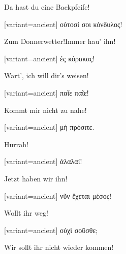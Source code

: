 Da hast du eine Backpfeife!

\switchcolumn

\begin{greek}[variant=ancient]%
οὑτοσί σοι κόνδυλος!

\end{greek}%
\switchcolumn*

Zum Donnerwetter!Immer hau' ihn!

\switchcolumn

\begin{greek}[variant=ancient]%
ἐς κόρακας!

\end{greek}%
\switchcolumn*

Wart', ich will dir's weisen!

\switchcolumn

\begin{greek}[variant=ancient]%
παῖε παῖε!

\end{greek}%
\switchcolumn*

Kommt mir nicht zu nahe!

\switchcolumn

\begin{greek}[variant=ancient]%
μὴ πρόσιτε.

\end{greek}%
\switchcolumn*

Hurrah!

\switchcolumn

\begin{greek}[variant=ancient]%
ἀλαλαί!

\end{greek}%
\switchcolumn*

Jetzt haben wir ihn!

\switchcolumn

\begin{greek}[variant=ancient]%
νῦν ἔχεται μέσος!

\end{greek}%
\switchcolumn*

Wollt ihr weg!

\switchcolumn

\begin{greek}[variant=ancient]%
οὐχὶ σοῦσθε;

\end{greek}%
\switchcolumn*

Wir sollt ihr nicht wieder kommen!

\switchcolumn

